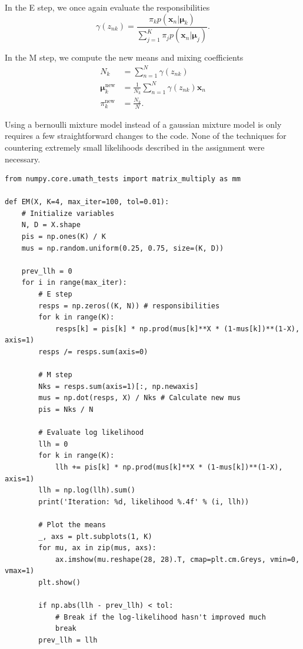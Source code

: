 \documentclass[a4paper]{article}
\begin{document}
\begin{enumerate}
In the E step, we once again evaluate the responsibilities
\begin{equation}
\gamma(z_{nk}) = \frac{\pi_kp(\bm{x}_n|\bm{\mu}_k)}{\sum_{j=1}^K\pi_jp(\bm{x}_n|\bm{\mu}_j)}.
\end{equation}

In the M step, we compute the new means and mixing coefficients
\begin{align}
N_k &= \sum_{n=1}^N\gamma(z_{nk}) \\
\bm{\mu}_k^{\text{new}} &=\frac{1}{N_k}\sum_{n=1}^N\gamma(z_{nk})\bm{x}_n \\
\pi_k^{\text{new}} &= \frac{N_k}{N}.
\end{align}

Using a bernoulli mixture model instead of a gaussian mixture model is only requires a few straightforward changes to the code. None of the techniques for countering extremely small likelihoods described in the assignment were necessary.

\begin{lstlisting}
from numpy.core.umath_tests import matrix_multiply as mm

def EM(X, K=4, max_iter=100, tol=0.01):
    # Initialize variables
    N, D = X.shape
    pis = np.ones(K) / K
    mus = np.random.uniform(0.25, 0.75, size=(K, D))
    
    prev_llh = 0
    for i in range(max_iter):
        # E step
        resps = np.zeros((K, N)) # responsibilities
        for k in range(K):
            resps[k] = pis[k] * np.prod(mus[k]**X * (1-mus[k])**(1-X), axis=1)
        resps /= resps.sum(axis=0)
        
        # M step
        Nks = resps.sum(axis=1)[:, np.newaxis]
        mus = np.dot(resps, X) / Nks # Calculate new mus
        pis = Nks / N
        
        # Evaluate log likelihood
        llh = 0
        for k in range(K):
            llh += pis[k] * np.prod(mus[k]**X * (1-mus[k])**(1-X), axis=1)
        llh = np.log(llh).sum()
        print('Iteration: %d, likelihood %.4f' % (i, llh))
        
        # Plot the means
        _, axs = plt.subplots(1, K)
        for mu, ax in zip(mus, axs):
            ax.imshow(mu.reshape(28, 28).T, cmap=plt.cm.Greys, vmin=0, vmax=1)
        plt.show()

        if np.abs(llh - prev_llh) < tol:
            # Break if the log-likelihood hasn't improved much
            break
        prev_llh = llh
    

\end{lstlisting}
\end{enumerate}
\end{document}
